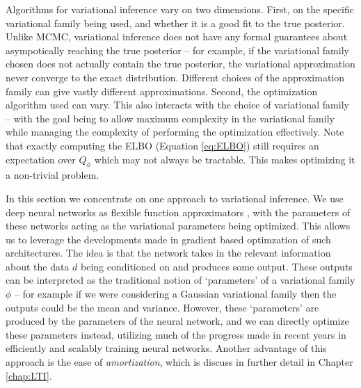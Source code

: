 Algorithms for variational inference vary on two dimensions. First, on the specific variational family being used, and whether it is a good fit to the true posterior. Unlike MCMC, variational inference does not have any formal guarantees about asympotically reaching the true posterior -- for example, if the variational family chosen does not actually contain the true posterior, the variational approximation never converge to the exact distribution. Different choices of the approximation family can give vastly different approximations. Second, the optimization algorithm used can vary. This also interacts with the choice of variational family -- with the goal being to allow maximum complexity in the variational family while managing the complexity of performing the optimization effectively. Note that exactly computing the ELBO (Equation \ref{eq:ELBO}) still requires an expectation over $Q_\phi$ which may not always be tractable. This makes optimizing it a non-trivial problem.

In this section we concentrate on one approach to variational inference. We use deep neural networks as flexible function approximators \citep{dayan1995helmholtz,kingma2014auto,mnih2014neural,rezende2015variational,paige2016inference}, with the parameters of these networks acting as the variational parameters being optimized. This allows us to leverage the developments made in gradient based optimzation of such architectures. The idea is that the network takes in the relevant information about the data $d$ being conditioned on and produces some output. These outputs can be interpreted as the traditional notion of `parameters' of a variational family $\phi$ -- for example if we were considering a Gaussian variational family then the outputs could be the mean and variance. However, these `parameters' are produced by the parameters of the neural network, and we can directly optimize these parameters instead, utilizing much of the progress made in recent years in efficiently and scalably training neural networks. Another advantage of this approach is the ease of \textit{amortization}, which is discuss in further detail in Chapter \ref{chap:LTI}.

